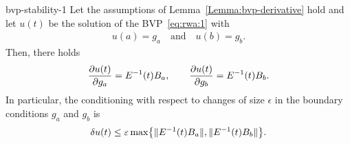 \begin{Theorem}{bvp-stability-1}
  Let the assumptions of Lemma~\ref{Lemma:bvp-derivative} hold and let
  $u(t)$ be the solution of the BVP~\eqref{eq:rwa:1} with
  \begin{gather*}
    u(a) = g_a\quad \text{and} \quad u(b) = g_b.
  \end{gather*}
  Then, there holds
  \begin{gather}
    \label{eq:rwa:20}
    \frac{\partial u(t)}{\partial g_a} = E^{-1}(t) B_a,
    \qquad
    \frac{\partial u(t)}{\partial g_b} = E^{-1}(t) B_b.
  \end{gather}
  In particular, the conditioning with respect to changes of size
  $\epsilon$ in the boundary conditions $g_a$ and $g_b$ is
  \begin{gather}
    \delta u(t) \le \varepsilon
    \max\bigl\{\lVert E^{-1}(t) B_a\rVert, \lVert E^{-1}(t)B_b\rVert\bigr\}.
  \end{gather}
\end{Theorem}
